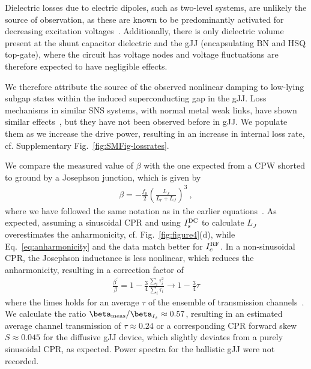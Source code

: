Dielectric losses due to electric dipoles, such as two-level systems, are unlikely the source of observation, as these are known to be predominantly activated for decreasing excitation voltages~\cite{martinisDecoherenceJosephsonQubits2005c,oconnellMicrowaveDielectricLoss2008a,gunnarssonDielectricLossesMultilayer2013}.
%
Additionally, there is only dielectric volume present at the shunt capacitor dielectric and the gJJ (encapsulating BN and HSQ top-gate), where the circuit has voltage nodes and voltage fluctuations are therefore expected to have negligible effects.

We therefore attribute the source of the observed nonlinear damping to low-lying subgap states within the induced superconducting gap in the gJJ.
%
Loss mechanisms in similar SNS systems, with normal metal weak links, have shown similar effects~\cite{fuechsleEffectMicrowavesCurrentPhase2009,dassonnevilleDissipationSupercurrentFluctuations2013}, but they have not been observed before in gJJ.
%
We populate them as we increase the drive power, resulting in an increase in internal loss rate, cf. Supplementary Fig.~\ref{fig:SMFig-lossrates}.

We compare the measured value of $\beta$ with the one expected from a CPW shorted to ground by a Josephson junction, which is given by
\begin{align}
\beta=-\frac{f_0}{2} \left(\frac{L_J}{L_r+L_J}\right)^3\ ,
\label{eq:anharmonicity}
\end{align}
%
where we have followed the same notation as in the earlier equations~\cite{wilsonPhotonGenerationElectromagnetic2010b,zhouHighgainWeaklyNonlinear2014}.
%
As expected, assuming a sinusoidal CPR and using $I_s^{\rm DC}$ to calculate $L_J$ overestimates the anharmonicity, cf. Fig.~\ref{fig:figure4}(d), while Eq.~\ref{eq:anharmonicity} and the data match better for $I_c^{\rm RF}$.
%
In a non-sinusoidal CPR, the Josephson inductance is less nonlinear, which reduces the anharmonicity, resulting in a correction factor of
\begin{align}
\frac{\beta^\prime}{\beta} =  1-\frac{3}{4}\frac{\sum_i\tau_i^2}{\sum_i\tau_i} \rightarrow 1-\frac{3}{4}\tau 
\label{eq:anh_nonsin}
\end{align}
%
where the limes holds for an average $\tau$ of the ensemble of transmission channels~\cite{kringhojAnharmonicitySuperconductingQubit2018}.
%
We calculate the ratio $\beta_{\rm meas}/\beta_{I_s}\approx0.57$, resulting in an estimated average channel transmission of $\tau\approx0.24$ or a corresponding CPR forward skew $S\approx0.045$ for the diffusive gJJ device, which slightly deviates from a purely sinusoidal CPR, as expected.
%
Power spectra for the ballistic gJJ were not recorded.

